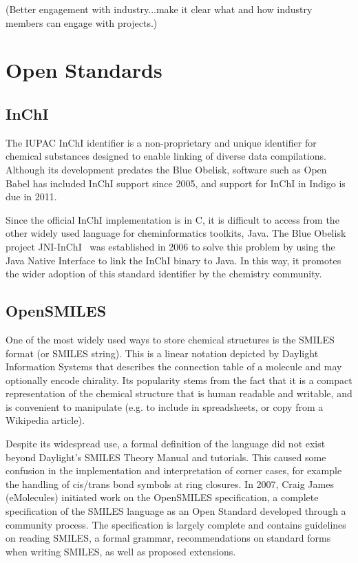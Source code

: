 \documentclass[10pt]{bmc_article}
\newenvironment{bmcformat}{\fussy\setboolean{publ}{true}}{\fussy}
\begin{document}
\begin{bmcformat}
(Better engagement with industry...make it clear what and how industry
 members can engage with projects.)

\section*{Open Standards}
  \subsection*{InChI}

The IUPAC InChI identifier is a non-proprietary and unique identifier
for chemical substances designed to enable linking of diverse data
compilations. Although its development predates the Blue Obelisk,
software such as Open Babel has included InChI support since 2005,
and support for InChI in Indigo is due in 2011.

Since the official InChI implementation is in C, it is difficult to
access from the other widely used language for cheminformatics
toolkits, Java. The Blue Obelisk project JNI-InChI~\cite{WebJNIInChI}
was established in 2006 to
solve this problem by using the Java Native Interface to link the
InChI binary to Java. In this way, it promotes the wider adoption of
this standard identifier by the chemistry community.

    \subsection*{OpenSMILES}

One of the most widely used ways to store chemical structures is the
SMILES format (or SMILES string). This is a linear notation depicted
by Daylight Information Systems that describes the connection table
of a molecule and may optionally encode chirality. Its popularity
stems from the fact that it is a compact representation of the
chemical structure that is human readable and writable, and is
convenient to manipulate (e.g. to include in spreadsheets, or copy
from a Wikipedia article).

Despite its widespread use, a formal
definition of the language did not exist beyond Daylight's SMILES
Theory Manual and tutorials. This caused some confusion in the
implementation and interpretation of corner cases, for example the
handling of cis/trans bond symbols at ring closures. In 2007, Craig
James (eMolecules) initiated work on the OpenSMILES specification, a
complete specification of the SMILES language as an Open Standard
developed through a community process. The specification is largely
complete and contains guidelines on reading SMILES, a formal
grammar, recommendations on standard forms when writing SMILES, as
well as proposed extensions.


\end{bmcformat}
\end{document}
